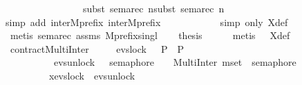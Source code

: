 \begin{isabellebody}
\ \ \ \ \ \ \ \ \ \ \ \ \ \ \ \ subst\ sema{\isacharunderscore}{\kern0pt}rec{\isacharbrackleft}{\kern0pt}\ n{\isacharequal}{\kern0pt}{\isacartoucheopen}{}{\isacartoucheclose}{\isacharbrackright}{\kern0pt}{\isacharcomma}{\kern0pt}subst\ sema{\isacharunderscore}{\kern0pt}rec{\isacharbrackleft}{\kern0pt}\ n{\isacharequal}{\kern0pt}{\isacartoucheopen}{}{\isacartoucheclose}{\isacharbrackright}{\kern0pt}{\isacharparenright}{\kern0pt}\ \isanewline
\ \ \ \ \ \ \ \ \ \ \isamarkupfalse%
{\isacharparenleft}{\kern0pt}simp\ add{\isacharcolon}{\kern0pt}\ inter{}Mprefix{}\ inter{}Mprefix{}{\isacharparenright}{\kern0pt}\ \isanewline
\ \ \ \ \ \ \ \ \ \ \isamarkupfalse%
{\isacharparenleft}{\kern0pt}simp\ only{\isacharcolon}{\kern0pt}\ X{\isacharunderscore}{\kern0pt}def{\isacharparenright}{\kern0pt}\ \isanewline
\ \ \ \ \ \ \ \ \ \ \isamarkupfalse%
\ {\isacharparenleft}{\kern0pt}metis\ sema{\isacharunderscore}{\kern0pt}rec\ assms\ Mprefix{\isacharunderscore}{\kern0pt}singl{\isacharparenright}{\kern0pt}\isanewline
\ \ \isamarkupfalse%
\ {\isacharquery}{\kern0pt}thesis\isanewline
\ \ \ \ \isamarkupfalse%
\ {\isacharparenleft}{\kern0pt}metis\ {\isacharasterisk}{\kern0pt}\ {\isacharasterisk}{\kern0pt}{\isacharasterisk}{\kern0pt}\ X{\isacharunderscore}{\kern0pt}def{\isacharparenright}{\kern0pt}\isanewline
{}\isamarkupfalse%
%
\endisatagproof
{\isafoldproof}%
%
\isadelimproof
\isanewline
%
\endisadelimproof
\isanewline
\isanewline
{}\isamarkupfalse%
\ contractMultiInter{}{\isacharprime}{\kern0pt}{\isacharprime}{\kern0pt}\ {\isacharcolon}{\kern0pt}\ \isanewline
\ \ \ {\isachardoublequoteopen}evs{\isachardot}{\kern0pt}lock\ {}\ {\isasymrightarrow}\ P{}\ {\isacharequal}{\kern0pt}\ P{}{\isachardoublequoteclose}\isanewline
\ \ \ {\isacartoucheopen}\isanewline
\ \ \ \ \ \ \ \ \ \ {\isacharparenleft}{\kern0pt}evs{\isachardot}{\kern0pt}unlock\ {}\ {\isasymrightarrow}\ semaphore\ {}\ \ {\isacharbar}{\kern0pt}{\isacharbar}{\kern0pt}{\isacharbar}{\kern0pt}\ MultiInter\ {\isacharparenleft}{\kern0pt}mset\ {\isacharbrackleft}{\kern0pt}{}{\isachardot}{\kern0pt}{\isachardot}{\kern0pt}{}{\isacharbrackright}{\kern0pt}{\isacharparenright}{\kern0pt}\ semaphore{\isacharparenright}{\kern0pt}\ \isanewline
\ \ \ \ \ \ \ \ {\isacharbar}{\kern0pt}{\isacharbar}{\kern0pt}\ {\isasymbox}x{\isasymin}{\isacharbraceleft}{\kern0pt}evs{\isachardot}{\kern0pt}lock\ {}{\isacharcomma}{\kern0pt}\ evs{\isachardot}{\kern0pt}unlock\ {}{\isacharbraceright}{\kern0pt}\isanewline

\end{isabellebody}
